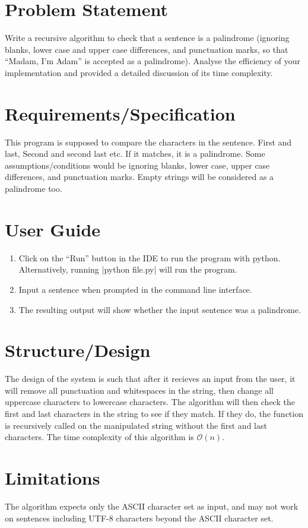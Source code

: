 \documentclass{report}
\begin{document}
\section{Problem Statement}
Write a recursive algorithm to check that a sentence is a palindrome (ignoring blanks, lower case and upper case differences, and punctuation marks, so that ``Madam, I'm Adam'' is accepted as a palindrome). Analyse the efficiency of your implementation and provided a detailed discussion of its time complexity.
\section{Requirements/Specification}
This program is supposed to compare the characters in the sentence. First and last, Second and second last etc. If it matches, it is a palindrome. Some assumptions/conditions would be ignoring blanks, lower case, upper case differences, and punctuation marks. Empty strings will be considered as a palindrome too.
\section{User Guide}
\begin{enumerate}
	\item Click on the ``Run'' button in the IDE to run the program with python. Alternatively, running |python file.py| will run the program.
	\item Input a sentence when prompted in the command line interface.
	\item The resulting output will show whether the input sentence was a palindrome.
\end{enumerate}
\section{Structure/Design}
The design of the system is such that after it recieves an input from the user, it will remove all punctuation and whitespaces in the string, then change all uppercase characters to lowercase characters. The algorithm will then check the first and last characters in the string to see if they match. If they do, the function is recursively called on the manipulated string without the first and last characters. The time complexity of this algorithm is \(\mathcal{O}(n)\).
\section{Limitations}
The algorithm expects only the ASCII character set as input, and may not work on sentences including UTF-8 characters beyond the ASCII character set.
\end{document}
